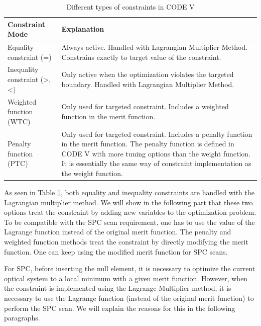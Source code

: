 \begin{table}[h!]
    \centering
    \captionsetup{justification=centering}
    \caption{Different types of constraints in CODE V\cite{codevmanual}}
    \label{table: codevconstraints}
    \vspace{-1em}
    \begin{tabular}{ p{} | m{} }
    \hline 
    \textbf{Constraint Mode} & \textbf{Explanation}\\
    \hline
    Equality constraint (=) & Always active. Handled with Lagrangian Multiplier Method. Constrains exactly to target value of the constraint.  \\
    \hline
    Inequality constraint (>, <) & Only active when the optimization violates the targeted boundary. Handled with Lagrangian Multiplier Method.\\
    \hline
    Weighted function (WTC) & Only used for targeted constraint. Includes a weighted function in the merit function.\\
    \hline
    Penalty function (PTC) & Only used for targeted constraint. Includes a penalty function in the merit function. The penalty function is defined in CODE V with more tuning options than the weight function. It is essentially the same way of constraint implementation as the weight function.\\
    \hline
    \end{tabular}
\end{table}

As seen in Table \ref{table: codevconstraints}, both equality and inequality constraints are handled with the Lagrangian multiplier method. We will show in the following part that these two options treat the constraint by adding new variables to the optimization problem. To be compatible with the SPC scan requirement, one has to use the value of the Lagrange function instead of the original merit function. The penalty and weighted function methods treat the constraint by directly modifying the merit function. One can keep using the modified merit function for SPC scans. 

For SPC, before inserting the null element, it is necessary to optimize the current optical system to a local minimum with a given merit function. However, when the constraint is implemented using the Lagrange Multiplier method, it is necessary to use the Lagrange function (instead of the original merit function) to perform the SPC scan. We will explain the reasons for this in the following paragraphs. 

